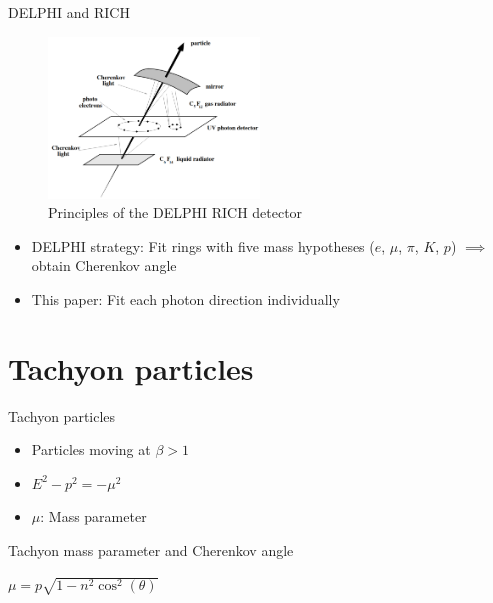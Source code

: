 \documentclass{beamer}
\begin{document}
\begin{frame}{DELPHI and RICH}
  \begin{figure}
    \centering
    \includegraphics[width = 0.50\textwidth]{Cherenkov.png}
    \caption{Principles of the DELPHI RICH detector}
    \vspace{-0.5cm}
  \end{figure}
  \begin{itemize}
    \item{DELPHI strategy: Fit rings with five mass hypotheses ($e$, $\mu$, $\pi$, $K$, $p$) $\implies$ obtain Cherenkov angle}
    \item{This paper: Fit each photon direction individually}
  \end{itemize}
\end{frame}

\section{Tachyon particles}
\begin{frame}{Tachyon particles}
  \begin{itemize}
    \setlength\itemsep{2.0em}
    \item{Particles moving at $\beta > 1$}
    \item{$E^2 - p^2 = -\mu^2$}
    \item{$\mu$: Mass parameter}
  \end{itemize}
  \vspace{0.5cm}
  \begin{block}{Tachyon mass parameter and Cherenkov angle}
    \begin{center}
      \vspace{0.3cm}
      $\mu = p\sqrt{1 - n^2\cos^2(\theta)}$
      \vspace{0.3cm}
    \end{center}
  \end{block}
\end{frame}
\end{document}
